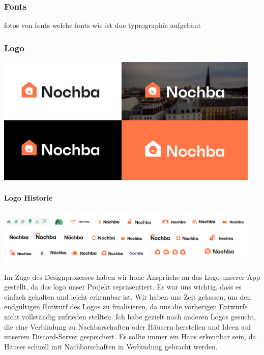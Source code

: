 \subsubsection{Fonts}
fotos von fonts
welche fonts
wie ist due typrographie aufgebaut
\subsubsection{Logo}

\includegraphics[width=0.95\textwidth]{pics/final-logo.png}


\paragraph{Logo Historie}



\includegraphics[width=0.95\textwidth]{pics/logo-historie.png}



Im Zuge des Designprozesses haben wir hohe Ansprüche an das
Logo unserer App gestellt, da das logo unser Projekt repräsentiert. Es war uns wichtig, dass es einfach gehalten
und leicht erkennbar ist. Wir haben uns Zeit gelassen, um
den endgültigen Entwurf des Logos zu finalisieren, da uns
die vorherigen Entwürfe nicht vollständig zufrieden
stellten. Ich habe gezielt nach anderen Logos gesucht, die
eine Verbindung zu Nachbarschaften oder Häusern herstellen
und Ideen auf unserem Discord-Server gespeichert. Es sollte
immer ein Haus erkennbar sein, da Häuser schnell mit
Nachbarschaften in Verbindung gebracht werden.

